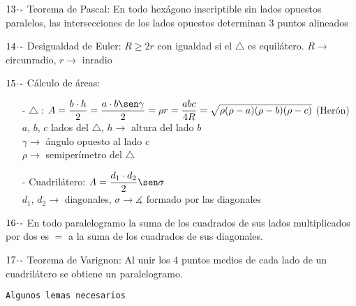  \vspace{0.4cm}
 
$ 13\hspace{-0.05cm}\cdot\hspace{-0.05cm}\text{-} $ Teorema de Pascal: En todo hexágono inscriptible sin lados opuestos paralelos, las intersecciones de los lados opuestos determinan 3 puntos alineados

$ 14\hspace{-0.05cm}\cdot\hspace{-0.05cm}\text{-} $ Desigualdad de Euler: $R \ge 2r$ con igualdad si el $\triangle$ es equilátero. $R \rightarrow $ circunradio, $r \rightarrow$ inradio

$ 15\hspace{-0.05cm}\cdot\hspace{-0.05cm}\text{-} $ Cálculo de áreas:
\begin{itemize}
    \item[-] $\triangle$ : $A = \dfrac{b\cdot h}{2}= \dfrac{a\cdot b \sen \gamma}{2} = \rho r = \dfrac{abc}{4R} = \sqrt{\rho(\rho-a)(\rho-b)(\rho-c)}$ (Herón)\vspace{0.4cm}\\
    $a$, $b$, $c$ lados del $\triangle$, $h \rightarrow$ altura del lado $b$\\
    $\gamma \rightarrow$ ángulo opuesto al lado $c$\\
    $\rho \rightarrow$ semiperímetro del $\triangle$
    
    \item[-] Cuadrilátero: $A = \dfrac{d_1 \cdot d_2}{2} \sen \sigma $\vspace{0.4cm}\\
    $d_1$, $d_2 \rightarrow$ diagonales, \hspace{0.5cm}$\sigma \rightarrow \measuredangle$ formado por las diagonales
\end{itemize}

$ 16\hspace{-0.05cm}\cdot\hspace{-0.05cm}\text{-} $  En todo paralelogramo la suma de los cuadrados de sus lados multiplicados por dos es $=$ a la suma de los cuadrados de sus diagonales.

$ 17\hspace{-0.05cm}\cdot\hspace{-0.05cm}\text{-} $ Teorema de Varignon: Al unir los 4 puntos medios de cada lado de un cuadrilátero se obtiene un paralelogramo.

\begin{center}
    \texttt{Algunos lemas necesarios}
\end{center}

